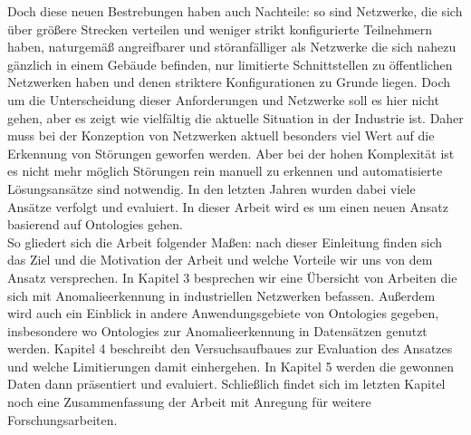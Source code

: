Doch diese neuen Bestrebungen haben auch Nachteile: so sind Netzwerke, die sich über größere Strecken verteilen und weniger strikt konfigurierte Teilnehmern haben, naturgemäß angreifbarer und störanfälliger als Netzwerke die sich nahezu gänzlich in einem Gebäude befinden, nur limitierte Schnittstellen zu öffentlichen Netzwerken haben und denen striktere Konfigurationen zu Grunde liegen. Doch um die Unterscheidung dieser Anforderungen und Netzwerke soll es hier nicht gehen, aber es zeigt wie vielfältig die aktuelle Situation in der Industrie ist. Daher muss bei der Konzeption von Netzwerken aktuell besonders viel Wert auf die Erkennung von Störungen geworfen werden. Aber bei der hohen Komplexität ist es nicht mehr möglich Störungen rein manuell zu erkennen und automatisierte Lösungsansätze sind notwendig. In den letzten Jahren wurden dabei viele Ansätze verfolgt und evaluiert. In dieser Arbeit wird es um einen neuen Ansatz basierend auf \Glspl{Ontologie} gehen.\\
So gliedert sich die Arbeit folgender Maßen: nach dieser Einleitung finden sich das Ziel und die Motivation der Arbeit und welche Vorteile wir uns von dem Ansatz versprechen. In Kapitel 3 besprechen wir eine Übersicht von Arbeiten die sich mit Anomalieerkennung in industriellen Netzwerken befassen. Außerdem wird auch ein Einblick in andere Anwendungsgebiete von \Glspl{Ontologie} gegeben, insbesondere wo \Glspl{Ontologie} zur Anomalieerkennung in Datensätzen genutzt werden. Kapitel 4 beschreibt den Versuchsaufbaues zur Evaluation des Ansatzes und welche Limitierungen damit einhergehen. In Kapitel 5 werden die gewonnen Daten dann präsentiert und evaluiert. Schließlich findet sich im letzten Kapitel noch eine Zusammenfassung der Arbeit mit Anregung für weitere Forschungsarbeiten.